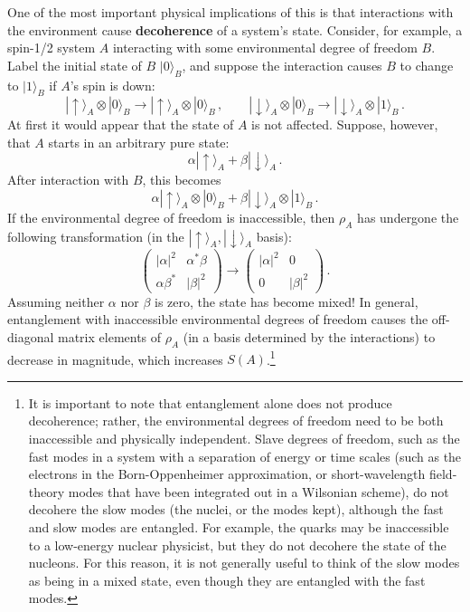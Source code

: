 \documentclass[11pt]{article}
\newcommand{\ket}[1]{|{#1}\rangle}
\begin{document}
One of the most important physical implications of this is that interactions with the environment cause \textbf{decoherence} of a system's state. Consider, for example, a spin-1/2 system $A$ interacting with some environmental degree of freedom $B$. Label the initial state of $B$ $\ket{0}_B$, and suppose the interaction causes $B$ to change to $\ket{1}_B$ if $A$'s spin is down:
\begin{equation}
\ket{\uparrow}_A\otimes\ket{0}_B \to\ket{\uparrow}_A\otimes\ket{0}_B \,,\qquad
\ket{\downarrow}_A\otimes\ket{0}_B \to\ket{\downarrow}_A\otimes\ket{1}_B \,.
\end{equation}
At first it would appear that the state of $A$ is not affected. Suppose, however, that $A$ starts in an arbitrary pure state:
\begin{equation}
\alpha\ket{\uparrow}_A+\beta\ket{\downarrow}_A\,.
\end{equation}
After interaction with $B$, this becomes
\begin{equation}
\alpha\ket{\uparrow}_A\otimes\ket{0}_B+\beta\ket{\downarrow}_A\otimes\ket{1}_B\,.
\end{equation}
If the environmental degree of freedom is inaccessible, then $\rho_A$ has undergone the following transformation (in the $\ket{\uparrow}_A,\ket{\downarrow}_A$ basis):
\begin{equation}
\begin{pmatrix}|\alpha|^2 & \alpha^*\beta \\ \alpha\beta^* & |\beta|^2 \end{pmatrix} \to
\begin{pmatrix}|\alpha|^2 & 0 \\ 0 & |\beta|^2 \end{pmatrix}\,.
\end{equation}
Assuming neither $\alpha$ nor $\beta$ is zero, the state has become mixed! In general, entanglement with inaccessible environmental degrees of freedom causes the off-diagonal matrix elements of $\rho_A$ (in a basis determined by the interactions) to decrease in magnitude, which increases $S(A)$.\footnote{It is important to note that entanglement alone does not produce decoherence; rather, the environmental degrees of freedom need to be both inaccessible and physically independent. Slave degrees of freedom, such as the fast modes in a system with a separation of energy or time scales (such as the electrons in the Born-Oppenheimer approximation, or short-wavelength field-theory modes that have been integrated out in a Wilsonian scheme), do not decohere the slow modes (the nuclei, or the modes kept), although the fast and slow modes are entangled. For example, the quarks may be inaccessible to a low-energy nuclear physicist, but they do not decohere the state of the nucleons. For this reason, it is not generally useful to think of the slow modes as being in a mixed state, even though they are entangled with the fast modes.}
\end{document}
